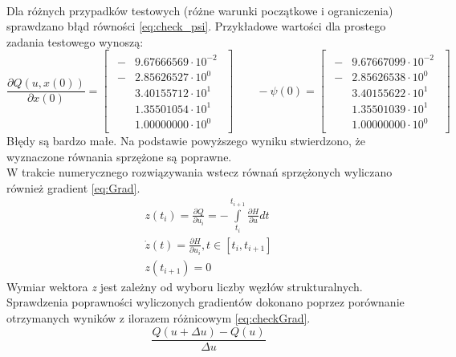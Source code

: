\paragraph*{}
Dla różnych przypadków testowych (różne warunki początkowe i ograniczenia) sprawdzano błąd równości \eqref{eq:check_psi}. Przykładowe wartości dla prostego zadania testowego wynoszą:
\begin{equation}
\frac{\partial Q(u,x(0))}{\partial x(0)}=
\begin{bmatrix}
\begin{aligned}
-&9.67666569\cdot 10^{-2}\\
-&2.85626527\cdot 10^{0}\\
&3.40155712\cdot 10^{1}\\
&1.35501054\cdot 10^{1}\\
&1.00000000\cdot 10^{0}
\end{aligned}
\end{bmatrix}
\qquad
-\psi(0)=
\begin{bmatrix}
\begin{aligned}
-&9.67667099\cdot 10^{-2}\\
-&2.85626538\cdot 10^{0}\\
&3.40155622\cdot 10^{1}\\
&1.35501039\cdot 10^{1}\\
&1.00000000\cdot 10^{0}
\end{aligned}
\end{bmatrix}
\end{equation}
Błędy są bardzo małe. Na podstawie powyższego wyniku stwierdzono, że wyznaczone równania sprzężone są poprawne.\\
W trakcie numerycznego rozwiązywania wstecz równań sprzężonych wyliczano również gradient \eqref{eq:Grad}.
\begin{equation}
\begin{aligned}
&z(t_i) = \frac{\partial Q}{\partial u_i}=-\int\limits_{t_i}^{t_{i+1}}\frac{\partial H}{\partial u}dt&\\
&\dot{z}(t) = \frac{\partial H}{\partial u_i}, t\in [t_i,t_{i+1}]&\\
&z(t_{i+1}) = 0
\label{eq:Grad}
\end{aligned}
\end{equation}
Wymiar wektora \textit{z} jest zależny od wyboru liczby węzłów strukturalnych. Sprawdzenia poprawności wyliczonych gradientów dokonano poprzez porównanie otrzymanych wyników z ilorazem różnicowym \eqref{eq:checkGrad}.
\begin{equation}
\label{eq:checkGrad}
\frac{Q(u+\Delta u)-Q(u)}{\Delta u}
\end{equation}
